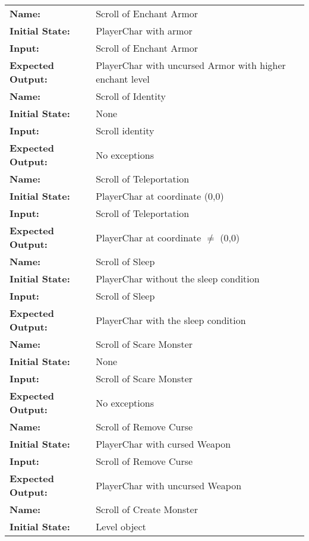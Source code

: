 \documentclass[12pt, titlepage]{article}
\begin{document}
\begin{center}
\begin{longtable}{ l | p{10cm} }
				\hline
				\rule{0pt}{1.5em}\textbf{Name:} & Scroll of Enchant Armor\\
				\textbf{Initial State:} & PlayerChar with armor\\
				\textbf{Input:} & Scroll of Enchant Armor\\
				\textbf{Expected Output:} & PlayerChar with uncursed Armor with higher enchant level\\[0.6em]
				\hline
				\rule{0pt}{1.5em}\textbf{Name:} & Scroll of Identity\\
				\textbf{Initial State:} & None\\
				\textbf{Input:} & Scroll identity\\
				\textbf{Expected Output:} & No exceptions\\[0.6em]
				\hline
				\rule{0pt}{1.5em}\textbf{Name:} & Scroll of Teleportation\\
				\textbf{Initial State:} & PlayerChar at coordinate (0,0)\\
				\textbf{Input:} & Scroll of Teleportation\\
				\textbf{Expected Output:} & PlayerChar at coordinate $\ne$ (0,0)\\[0.6em]
				\hline
				\rule{0pt}{1.5em}\textbf{Name:} & Scroll of Sleep\\
				\textbf{Initial State:} & PlayerChar without the sleep condition\\
				\textbf{Input:} & Scroll of Sleep\\
				\textbf{Expected Output:} & PlayerChar with the sleep condition\\[0.6em]
				\hline
				\rule{0pt}{1.5em}\textbf{Name:} & Scroll of Scare Monster\\
				\textbf{Initial State:} & None\\
				\textbf{Input:} & Scroll of Scare Monster\\
				\textbf{Expected Output:} & No exceptions\\[0.6em]
				\hline
				\rule{0pt}{1.5em}\textbf{Name:} & Scroll of Remove Curse\\
				\textbf{Initial State:} & PlayerChar with cursed Weapon\\
				\textbf{Input:} & Scroll of Remove Curse\\
				\textbf{Expected Output:} & PlayerChar with uncursed Weapon\\[0.6em]
				\hline
				\rule{0pt}{1.5em}\textbf{Name:} & Scroll of Create Monster\\
				\textbf{Initial State:} & Level object\\

\end{longtable}
\end{center}
\end{document}
